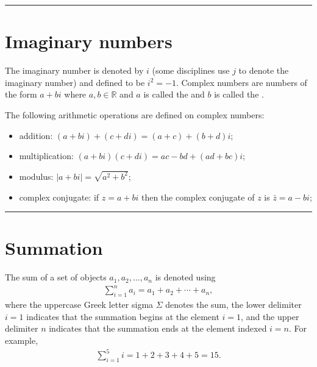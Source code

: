 \documentclass[letterpaper,10pt,english]{jupyterBook}
\begin{document}
\bigskip\hrule\bigskip



\section{Imaginary numbers}
\label{\detokenize{_pages/0.3_Mathematical_preliminaries:imaginary-numbers}}
\sphinxAtStartPar
The imaginary number is denoted by \(i\) (some disciplines use \(j\) to denote the imaginary number) and defined to be \(i^2 = -1\). Complex numbers are numbers of the form \(a + bi\) where \(a,b\in \mathbb{R}\) and \(a\) is called the  and \(b\) is called the .

\sphinxAtStartPar
The following arithmetic operations are defined on complex numbers:
\begin{itemize}
\item {} 
\sphinxAtStartPar
addition: \((a + bi) + (c + di) = (a + c) + (b + d)i\);

\item {} 
\sphinxAtStartPar
multiplication: \((a + bi) (c + di) = ac - bd + (ad + bc)i\);

\item {} 
\sphinxAtStartPar
modulus: \(|a + bi| = \sqrt{a^2 + b^2}\);

\item {} 
\sphinxAtStartPar
complex conjugate: if \(z = a + bi\) then the complex conjugate of \(z\) is \(\bar{z} = a - bi\);

\end{itemize}


\bigskip\hrule\bigskip



\section{Summation}
\label{\detokenize{_pages/0.3_Mathematical_preliminaries:summation}}
\sphinxAtStartPar
The sum of a set of objects \(a_1, a_2, \ldots, a_n\) is denoted using
\begin{equation*}
\begin{split}\sum_{i=1}^n a_i = a_1 + a_2 + \cdots + a_n,\end{split}
\end{equation*}
\sphinxAtStartPar
where the uppercase Greek letter sigma \(\Sigma\) denotes the sum, the lower delimiter \(i=1\) indicates that the summation begins at the element \(i=1\), and the upper delimiter \(n\) indicates that the summation ends at the element indexed \(i=n\). For example,
\begin{equation*}
\begin{split} \sum_{i=1}^5 i = 1 + 2 + 3 + 4 + 5 = 15. \end{split}
\end{equation*}
\end{document}
